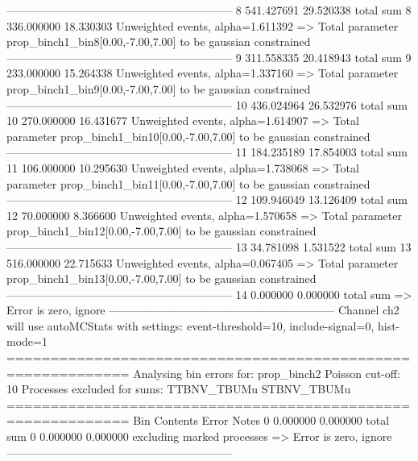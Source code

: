 ------------------------------------------------------------
8          541.427691      29.520338       total sum                     
8          336.000000      18.330303       Unweighted events, alpha=1.611392
  => Total parameter prop_binch1_bin8[0.00,-7.00,7.00] to be gaussian constrained
------------------------------------------------------------
9          311.558335      20.418943       total sum                     
9          233.000000      15.264338       Unweighted events, alpha=1.337160
  => Total parameter prop_binch1_bin9[0.00,-7.00,7.00] to be gaussian constrained
------------------------------------------------------------
10         436.024964      26.532976       total sum                     
10         270.000000      16.431677       Unweighted events, alpha=1.614907
  => Total parameter prop_binch1_bin10[0.00,-7.00,7.00] to be gaussian constrained
------------------------------------------------------------
11         184.235189      17.854003       total sum                     
11         106.000000      10.295630       Unweighted events, alpha=1.738068
  => Total parameter prop_binch1_bin11[0.00,-7.00,7.00] to be gaussian constrained
------------------------------------------------------------
12         109.946049      13.126409       total sum                     
12         70.000000       8.366600        Unweighted events, alpha=1.570658
  => Total parameter prop_binch1_bin12[0.00,-7.00,7.00] to be gaussian constrained
------------------------------------------------------------
13         34.781098       1.531522        total sum                     
13         516.000000      22.715633       Unweighted events, alpha=0.067405
  => Total parameter prop_binch1_bin13[0.00,-7.00,7.00] to be gaussian constrained
------------------------------------------------------------
14         0.000000        0.000000        total sum                     
  => Error is zero, ignore      
------------------------------------------------------------
Channel ch2 will use autoMCStats with settings: event-threshold=10, include-signal=0, hist-mode=1
============================================================
Analysing bin errors for: prop_binch2
Poisson cut-off: 10
Processes excluded for sums: TTBNV_TBUMu STBNV_TBUMu
============================================================
Bin        Contents        Error           Notes                         
0          0.000000        0.000000        total sum                     
0          0.000000        0.000000        excluding marked processes    
  => Error is zero, ignore      
------------------------------------------------------------
